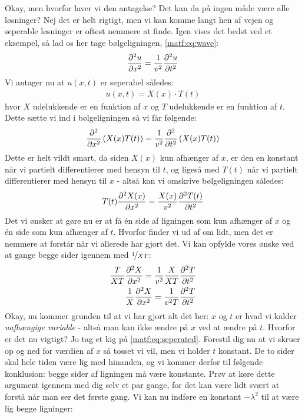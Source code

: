 \documentclass[crop=false, class=memoir]{standalone}
\begin{document}
Okay, men hvorfor laver vi den antagelse? Det kan da på ingen måde være alle løsninger? Nej det er helt rigtigt, men vi kan komme langt hen af vejen og seperable løsninger er oftest nemmere at finde. Igen vises det bedst ved et eksempel, så lad os her tage bølgeligningen, \cref{matf:eq:wave}:
\begin{align}
    \pdv[2]{u}{x} = \frac{1}{v^2} \pdv[2]{u}{t}
\end{align}
Vi antager nu at $u(x,t)$ er seperabel således:
\begin{align}
    u(x,t) = X(x) \cdot T(t)
\end{align}
hvor $X$ udelukkende er en funktion af $x$ og $T$ udelukkende er en funktion af $t$. Dette sætte vi ind i bølgeligningen så vi får følgende:
\begin{align}
    \pdv[2]{}{x}\left( X(x) T(t) \right) = \frac{1}{v^2} \pdv[2]{}{t}\left( X(x) T(t) \right)
\end{align}
Dette er helt vildt smart, da siden $X(x)$ kun afhænger af $x$, er den en konstant når vi partielt differentierer med hensyn til $t$, og ligeså med $T(t)$ når vi partielt differentierer med hensyn til $x$ - altså kan vi omskrive bølgeligningen således:
\begin{align}
    T(t) \pdv[2]{X(x)}{x} =\frac{X(x)}{v^2} \pdv[2]{T(t)}{t}
\end{align}
Det vi ønsker at gøre nu er at få én side af ligningen som kun afhænger af $x$ og én side som kun afhænger af $t$. Hvorfor finder vi ud af om lidt, men det er nemmere at forstår når vi allerede har gjort det. Vi kan opfylde vores ønske ved at gange begge sider igennem med $\nicefrac{1}{XT}$:
\begin{align}
    \frac{T}{XT}\pdv[2]{X}{x} = \frac{1}{v^2}\frac{X}{XT}\pdv[2]{T}{t} \\
    \frac{1}{X} \pdv[2]{X}{x} = \frac{1}{v^2 T}\pdv[2]{T}{t}
    \label{matf:eq:seperated}
\end{align}
Okay, nu kommer grunden til at vi har gjort alt det her: $x$ og $t$ er hvad vi kalder \emph{uafhængige variable} - altså man kan ikke ændre på $x$ ved at ændre på $t$. Hvorfor er det nu vigtigt? Jo tag et kig på \cref{matf:eq:seperated}. Forestil dig nu at vi skruer op og ned for værdien af $x$ så tosset vi vil, men vi holder $t$ konstant. De to sider skal hele tiden være lig med hinanden, og vi kommer derfor til følgende konklusion: begge sider af ligningen må være konstante. Prøv at køre dette argument igennem med dig selv et par gange, for det kan være lidt svært at forstå når man ser det første gang. Vi kan nu indføre en konstant $-\lambda^2$ til at være lig begge ligninger:
\end{document}
